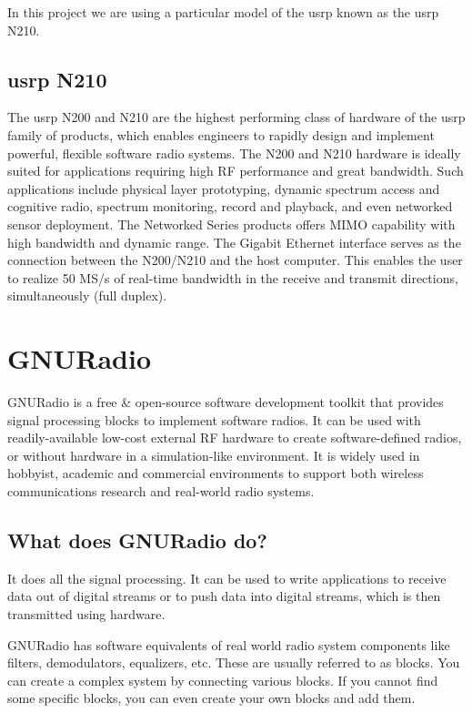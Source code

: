 In this project we are using a particular model of the \gls{usrp} known as the
\gls{usrp} N210.

\subsection{\gls{usrp} N210}

The \gls{usrp} N200 and N210 are the highest performing class of hardware of the 
\gls{usrp} family of products, which enables engineers to rapidly design and 
implement powerful, flexible software radio systems. The N200 and N210 
hardware is ideally suited for applications requiring high RF performance and
great bandwidth. Such applications include physical layer prototyping, dynamic
spectrum access and cognitive radio, spectrum monitoring, record and playback,
and even networked sensor deployment. The Networked Series products offers 
MIMO capability with high bandwidth and dynamic range. The Gigabit Ethernet
interface serves as the connection between the N200/N210 and the host 
computer. This enables the user to realize 50 MS/s of real-time bandwidth in 
the receive and transmit directions, simultaneously (full duplex).


\section{GNURadio}

GNURadio is a free \& open-source software development toolkit that provides 
signal processing blocks to implement software radios. It can be used with 
readily-available low-cost external RF hardware to create software-defined 
radios, or without hardware in a simulation-like environment. It is widely 
used in hobbyist, academic and commercial environments to support both 
wireless communications research and real-world radio systems.

\subsection{What does GNURadio do?}
It does all the signal processing. It can be used to write applications to 
receive data out of digital streams or to push data into digital streams, 
which is then transmitted using hardware.

GNURadio has software equivalents of real world radio system components like 
filters, demodulators, equalizers, etc. These are usually referred to as
blocks. You can create a complex system by connecting various blocks. If you
cannot find some specific blocks, you can even create your own blocks and add
them.

